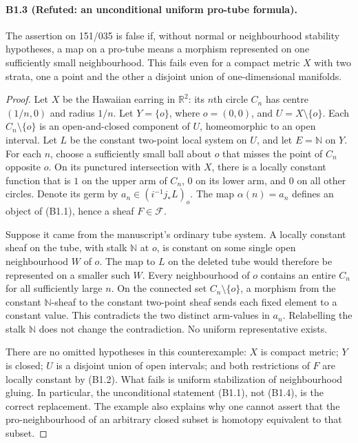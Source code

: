 \paragraph{B1.3 (Refuted: an unconditional uniform pro-tube formula).}
The assertion on 151/035 is false if, without normal or neighbourhood
stability hypotheses, a map on a pro-tube means a morphism represented
on one sufficiently small neighbourhood. This fails even for a compact
metric $X$ with two strata, one a point and the other a disjoint union
of one-dimensional manifolds.

\begin{proof}
Let $X$ be the Hawaiian earring in $\mathbb R^2$: its $n$th circle $C_n$
has centre $(1/n,0)$ and radius $1/n$. Let $Y=\{o\}$, where $o=(0,0)$,
and $U=X\setminus\{o\}$. Each $C_n\setminus\{o\}$ is an open-and-closed
component of $U$, homeomorphic to an open interval. Let $L$ be the
constant two-point local system on $U$, and let $E=\mathbb N$ on $Y$.
For each $n$, choose a sufficiently small ball about $o$ that misses the
point of $C_n$ opposite $o$. On its punctured intersection with $X$,
there is a locally constant function that is $1$ on the upper arm of
$C_n$, $0$ on its lower arm, and $0$ on all other circles. Denote its
germ by $a_n\in(i^{-1}j_*L)_o$. The map $\alpha(n)=a_n$ defines an
object of (B1.1), hence a sheaf $F\in\mathcal F$.

Suppose it came from the manuscript's ordinary tube system. A locally
constant sheaf on the tube, with stalk $\mathbb N$ at $o$, is constant
on some single open neighbourhood $W$ of $o$. The map to $L$ on the
deleted tube would therefore be represented on a smaller such $W$.
Every neighbourhood of $o$ contains an entire $C_n$ for all sufficiently
large $n$. On the connected set $C_n\setminus\{o\}$, a morphism from
the constant $\mathbb N$-sheaf to the constant two-point sheaf sends
each fixed element to a constant value. This contradicts the two
distinct arm-values in $a_n$. Relabelling the stalk $\mathbb N$ does
not change the contradiction. No uniform representative exists.

There are no omitted hypotheses in this counterexample: $X$ is compact
metric; $Y$ is closed; $U$ is a disjoint union of open intervals; and
both restrictions of $F$ are locally constant by (B1.2). What fails is
uniform stabilization of neighbourhood gluing. In particular, the
unconditional statement (B1.1), not (B1.4), is the correct replacement.
The example also explains why one cannot assert that the pro-neighbourhood
of an arbitrary closed subset is homotopy equivalent to that subset.
\end{proof}

